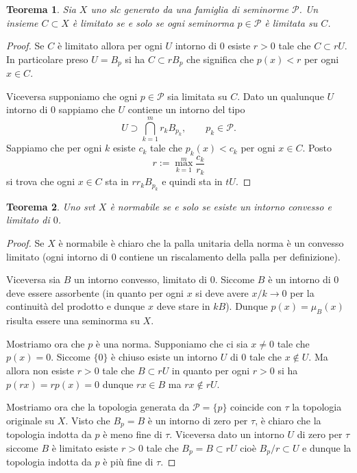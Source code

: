 \documentclass[italian,a4paper,oneside,headinclude]{scrbook}
\renewcommand{\P}{\mathcal P}
\newcommand{\defeq}{:=}
\newtheorem{theorem}{Teorema}
\begin{document}
\begin{theorem}
  Sia $X$ uno slc generato da una famiglia di seminorme $\P$.
  Un insieme $C\subset X$ è limitato se e solo se ogni seminorma
  $p\in\P$ è
  limitata su $C$.
\end{theorem}
%
\begin{proof}
  Se $C$ è limitato allora per ogni $U$ intorno di $0$ esiste $r>0$
  tale che $C\subset rU$. In particolare preso $U=B_p$ si ha
  $C\subset rB_p$ che significa che $p(x)<r$ per ogni $x\in C$.

  Viceversa supponiamo che ogni $p\in\P$ sia limitata su $C$. Dato un
  qualunque $U$ intorno di $0$ sappiamo che $U$ contiene un intorno
  del tipo
  \[
  U \supset \bigcap_{k=1}^m r_k B_{p_k},\qquad p_k\in\P.
  \]
  Sappiamo che per ogni $k$ esiste $c_k$ tale che $p_k(x)<c_k$ per
  ogni $x\in C$. Posto
  \[
   r \defeq \max_{k=1}^m \frac{c_k}{r_k}
   \]
   si trova che ogni $x\in C$ sta in $r r_k B_{p_k}$ e quindi sta in
   $t U$.
\end{proof}


\begin{theorem}
  Uno svt $X$ è normabile se e solo se esiste un intorno convesso e
  limitato di $0$.
\end{theorem}
\begin{proof}
  Se $X$ è normabile è chiaro che la palla unitaria della norma è un
  convesso limitato (ogni intorno di $0$ contiene un riscalamento
  della palla per definizione).

  Viceversa sia $B$ un intorno convesso, limitato di $0$. Siccome $B$
  è un intorno di $0$ deve essere assorbente (in quanto per ogni $x$
  si deve avere $x/k\to 0$ per la continuità del prodotto e dunque $x$
  deve stare in $k B$). Dunque $p(x)=\mu_B(x)$ risulta essere una
  seminorma su $X$.

  Mostriamo ora che $p$ è una norma. Supponiamo che
  ci sia $x\neq 0$ tale che $p(x)=0$. Siccome $\{0\}$ è chiuso esiste
  un intorno $U$ di $0$ tale che $x\not \in U$. Ma allora non esiste
  $r>0$ tale che $B\subset rU$ in quanto per ogni $r>0$ si ha
  $p(rx)=rp(x)=0$ dunque $rx\in B$ ma $rx\not \in rU$.

  Mostriamo ora che la topologia generata da $\P=\{p\}$ coincide con
  $\tau$ la topologia originale su $X$. Visto che $B_p=B$ è un intorno
  di zero per $\tau$, è chiaro che la topologia indotta da $p$ è meno
  fine di $\tau$. Viceversa dato un intorno $U$ di zero per $\tau$
  siccome $B$ è limitato esiste $r>0$ tale che $B_p=B\subset rU$ cioè
  $B_p/r \subset U$ e dunque la topologia indotta da $p$ è più fine di
  $\tau$.
  \end{proof}
\end{document}
